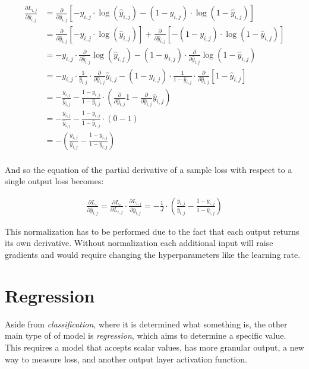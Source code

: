 \documentclass[a4paper]{article}
\begin{document}
\begin{align*}
    \frac{\partial L_{i,j}}{\partial\hat{y}_{i,j}} &= \frac{\partial}{\partial\hat{y}_{i,j}} \left[ -y_{i,j} \cdot \log(\hat{y}_{i,j}) - (1-y_{i,j}) \cdot \log(1-\hat{y}_{i,j}) \right] \\
    &= \frac{\partial}{\partial\hat{y}_{i,j}} \left[ -y_{i,j} \cdot \log(\hat{y}_{i,j}) \right] + \frac{\partial}{\partial\hat{y}_{i,j}} \left[ -(1-y_{i,j}) \cdot \log(1-\hat{y}_{i,j}) \right]\\
    &= -y_{i,j} \cdot \frac{\partial}{\partial\hat{y}_{i,j}} \log(\hat{y}_{i,j}) - (1-y_{i,j}) \cdot \frac{\partial}{\partial\hat{y}_{i,j}} \log(1-\hat{y}_{i,j}) \\
    &= -y_{i,j} \cdot \frac{1}{\hat{y}_{i,j}} \cdot \frac{\partial}{\partial\hat{y}_{i,j}}\hat{y}_{i,j} - (1-y_{i,j}) \cdot \frac{1}{1-\hat{y}_{i,j}} \cdot \frac{\partial}{\partial\hat{y}_{i,j}}[1-\hat{y}_{i,j}] \\
    &= -\frac{y_{i,j}}{\hat{y}_{i,j}} - \frac{1-y_{i,j}}{1-\hat{y}_{i,j}} \cdot \left( \frac{\partial}{\partial\hat{y}_{i,j}}1 - \frac{\partial}{\partial\hat{y}_{i,j}} \hat{y}_{i,j} \right) \\
    &= -\frac{y_{i,j}}{\hat{y}_{i,j}} - \frac{1-y_{i,j}}{1-\hat{y}_{i,j}} \cdot (0-1) \\
    &= - \left( \frac{y_{i,j}}{\hat{y}_{i,j}} - \frac{1-y_{i,j}}{1-\hat{y}_{i,j}} \right) \\
\end{align*}

And so the equation of the partial derivative of a sample loss with respect to a single output loss becomes:

\begin{align*}
    \frac{\partial L_i}{\partial\hat{y}_{i,j}} = \frac{\partial L_i}{\partial L_{i,j}} \cdot \frac{\partial L_{i,j}}{\partial\hat{y}_{i,j}} = -\frac{1}{J} \cdot \left( \frac{y_{i,j}}{\hat{y}_{i,j}} - \frac{1-y_{i,j}}{1-\hat{y}_{i,j}} \right)
\end{align*}

This normalization has to be performed due to the fact that each output returns its own derivative. Without normalization each additional input will raise gradients and would require changing the hyperparameters like the learning rate.

\section*{Regression}
Aside from \emph{classification}, where it is determined what something is, the other main type of of model is \emph{regression}, which aims to determine a specific value. This requires a model that accepts scalar values, has more granular output, a new way to measure loss, and another output layer activation function.
\end{document}
